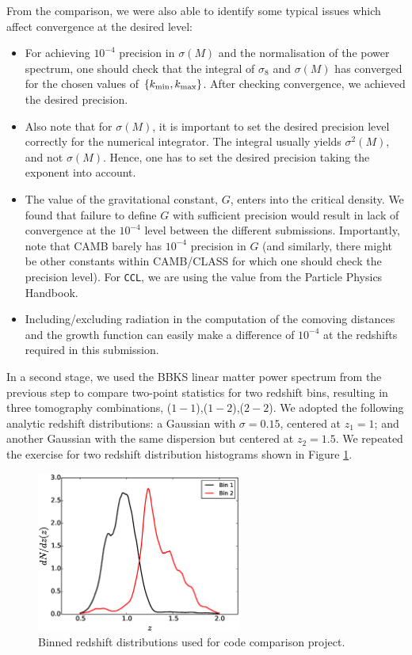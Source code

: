 \documentclass[\docopts]{\docclass}
\begin{document}
From the comparison, we were also able to identify some typical issues which affect convergence at the desired level:
\begin{itemize}
\item For achieving $10^{-4}$ precision in $\sigma(M)$ and the normalisation of the power spectrum, one should check that the integral of $\sigma_8$ and $\sigma(M)$ has converged for the chosen values of $\{k_{\rm min},k_{\rm max}\}$. After checking convergence, we achieved the desired precision.
\item Also note that for $\sigma(M)$, it is important to set the desired precision level correctly for the numerical integrator. The integral usually yields $\sigma^2(M)$, and not $\sigma(M)$. Hence, one has to set the desired precision taking the exponent into account.
\item The value of the gravitational constant, $G$, enters into the critical density. We found that failure to define $G$ with sufficient precision would result in lack of convergence at the $10^{-4}$ level between the different submissions. Importantly, note that CAMB barely has $10^{-4}$ precision in $G$ (and similarly, there might be other constants within CAMB/CLASS for which one should check the precision level). For {\tt CCL}, we are using the value from the Particle Physics Handbook. %
\item Including/excluding radiation in the computation of the comoving distances and the growth function can easily make a difference of $10^{-4}$ at the redshifts required in this submission.
\end{itemize}

In a second stage, we used the BBKS linear matter power spectrum from the previous step to compare two-point statistics for two redshift bins, resulting in three tomography combinations, ($1-1$),($1-2$),($2-2$). We adopted the following analytic redshift distributions: a Gaussian with $\sigma = 0.15$, centered at $z_1 = 1$; and another Gaussian with the same dispersion but centered at $z_2 = 1.5$. We repeated the exercise for two redshift distribution histograms shown in Figure \ref{fig:zhistos}.

\begin{figure}
\centering
\includegraphics[width=0.6\textwidth]{zdist.eps}
\caption{Binned redshift distributions used for code comparison project.}
\label{fig:zhistos}
\end{figure}
\end{document}
